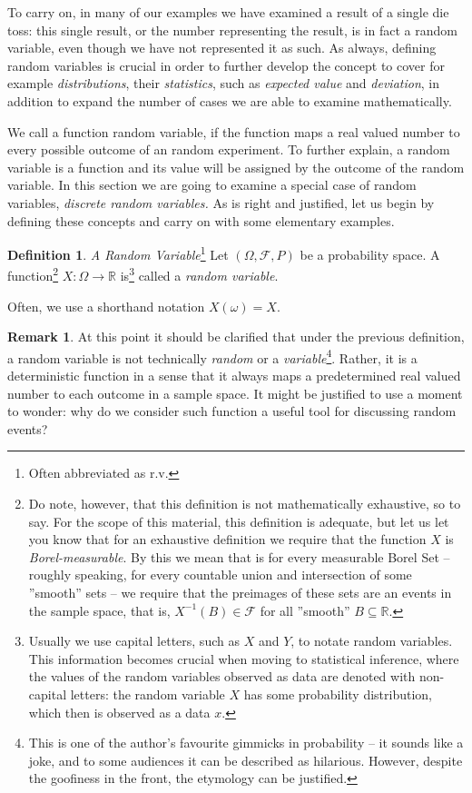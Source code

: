 \documentclass[12pt,a4paper,leqno]{report}
\newcommand{\R}{\mathbb{R}}
\newcommand{\F}{\mathcal{F}}
\theoremstyle{plain}
\theoremstyle{definition}
\newtheorem{maar}[equation]{Definition}
\newtheorem{remark}[equation]{Remark}
\begin{document}
To carry on, in many of our examples we have examined a result of a single die toss: this single result, or the number representing the result, is in fact a random variable, even though we have not represented it as such. As always, defining random variables is crucial in order to further develop the concept to cover for example \emph{distributions}, their \emph{statistics}, such as \emph{expected value} and \emph{deviation}, in addition to expand the number of cases we are able to examine mathematically.

We call a function random variable, if the function maps a real valued number to every possible outcome of an random experiment. To further explain, a random variable is a function and its value will be assigned by the outcome of the random variable. In this section we are going to examine a special case of random variables, \emph{discrete random variables.} As is right and justified, let us begin by defining these concepts and carry on with some elementary examples.

\begin{maar} \label{maar:rv}
\emph{A Random Variable}\footnote{Often abbreviated as r.v.}  Let $(\Omega, \F, P)$ be a probability space. A function\footnote{Do note, however, that this definition is not mathematically exhaustive, so to say. For the scope of this material, this definition is adequate, but let us let you know that for an exhaustive definition we require that the function $X$ is \emph{Borel-measurable}. By this we mean that is for every measurable Borel Set -- roughly speaking, for every countable union and intersection of some ''smooth'' sets -- we require that the preimages of these sets are an events in the sample space, that is, $X^{-1}(B) \in \F$ for all ''smooth'' $B\subseteq \R$.} $X:\Omega \rightarrow \R$ is\footnote{Usually we use capital letters, such as $X$ and $Y$, to notate random variables. This information becomes crucial when moving to statistical inference, where the values of the random variables observed as data are denoted with non-capital letters: the random variable $X$ has some probability distribution, which then is observed as a data $x$.}\label{footer:capitalx} called a  \emph{random variable}. 
\end{maar}

Often, we use a shorthand notation $X(\omega)=X$.

\begin{remark}
At this point it should be clarified that under the previous definition, a random variable is not technically \emph{random} or a \emph{variable}\footnote{This is one of the author's favourite gimmicks in probability -- it sounds like a joke, and to some audiences it can be described as hilarious. However, despite the goofiness in the front, the etymology can be justified.}. Rather, it is a deterministic function in a sense that it always maps a predetermined real valued number to each outcome in a sample space. It might be justified to use a moment to wonder: why do we consider such function a useful tool for discussing random events?
\end{remark}
\end{document}
